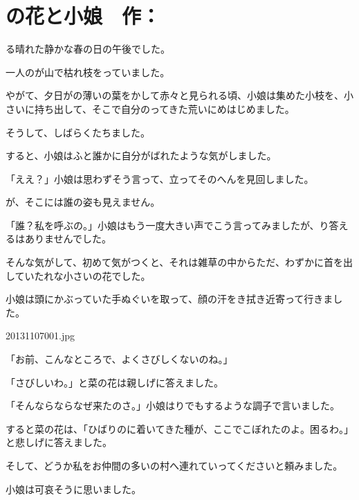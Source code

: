 \section{の花と小娘　作：}

る晴れた静かな春の日の午後でした。


一人のが山で枯れ枝をっていました。

やがて、夕日がの薄いの葉をかして赤々と見られる頃、小娘は集めた小枝を、小さいに持ち出して、そこで自分のってきた荒いにめはじめました。

そうして、しばらくたちました。

すると、小娘はふと誰かに自分がばれたような気がしました。

「ええ？」小娘は思わずそう言って、立ってそのへんを見回しました。

が、そこには誰の姿も見えません。

「誰？私を呼ぶの。」小娘はもう一度大きい声でこう言ってみましたが、り答えるはありませんでした。

そんな気がして、初めて気がつくと、それは雑草の中からただ、わずかに首を出していたれな小さいの花でした。

小娘は頭にかぶっていた手ぬぐいを取って、顔の汗をき拭き近寄って行きました。



20131107001.jpg



「お前、こんなところで、よくさびしくないのね。」

「さびしいわ。」と菜の花は親しげに答えました。

「そんならならなぜ来たのさ。」小娘はりでもするような調子で言いました。

すると菜の花は、「ひばりのに着いてきた種が、ここでこぼれたのよ。困るわ。」と悲しげに答えました。

そして、どうか私をお仲間の多いの村へ連れていってくださいと頼みました。

小娘は可哀そうに思いました。

